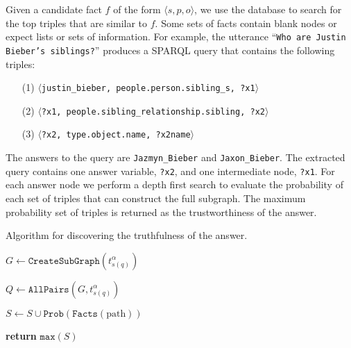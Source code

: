 Given a candidate fact \(f\) of the form \(\langle s, p, o \rangle\), we use the
database to search for the top triples that are similar to \(f\).
Some sets of facts contain blank nodes or expect lists or sets of information.
For example, the utterance ``\texttt{Who are Justin Bieber's siblings?}'' produces 
a SPARQL query that contains the following triples: 
\begin{enumerate}
\item[(1)] \(\langle\)\texttt{justin\_bieber, people.person.sibling\_s, ?x1}\(\rangle\)
\item[(2)] \(\langle\)\texttt{?x1, people.sibling\_relationship.sibling, ?x2}\(\rangle\)
\item[(3)] \(\langle\)\texttt{?x2, type.object.name, ?x2name}\(\rangle\)
\end{enumerate}

The answers to the query are \texttt{Jazmyn\_Bieber} and \texttt{Jaxon\_Bieber}.
The extracted query contains one answer variable, \texttt{?x2}, and one intermediate node, \texttt{?x1}.
For each answer node we perform a depth first
search to evaluate the probability of each set of triples that can construct
the full subgraph.
The maximum probability set of triples is returned as the trustworthiness of the answer.


\begin{algorithm}
\caption{Algorithm for discovering the truthfulness of the answer.}
\label{alg:probqa-truthfulness}
\begin{algorithmic}[1]

\State $G \leftarrow \mathtt{CreateSubGraph}(t_{s(q)}^\alpha)$ \label{algo:line:createsubgraph}

\State $Q \leftarrow \mathtt{AllPairs}(G, t_{s(q)}^\alpha)$  \label{algo:line:allpairs}

  \label{algo:line:jointprob-start}
  \State $S \leftarrow S \cup \mathtt{Prob}(\mathtt{Facts}(\text{path}))$ 
\EndFor \label{algo:line:jointprob-end}

\State \textbf{return} $\mathtt{max}(S)$
\EndProcedure
\end{algorithmic}
\end{algorithm}

